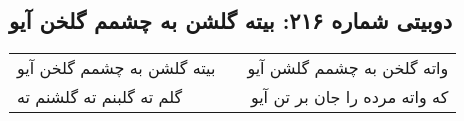 \begin{center}
\section*{دوبیتی شماره ۲۱۶: بیته گلشن به چشمم گلخن آیو}
\label{sec:216}
\begin{longtable}{l p{0.5cm} r}
بیته گلشن به چشمم گلخن آیو
&&
واته گلخن به چشمم گلشن آیو
\\
گلم ته گلبنم ته گلشنم ته
&&
که واته مرده را جان بر تن آیو
\\
\end{longtable}
\end{center}
